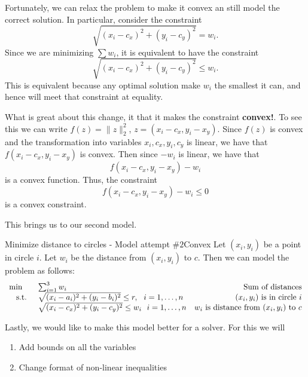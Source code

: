 \documentclass[../open-optimization/open-optimization.tex]{subfiles}
\begin{document}
Fortunately, we can relax the problem to make it convex an still model the correct solution.  In particular, consider the constraint 
$$
 \sqrt{(x_i - c_x)^2 + (y_i - c_y)^2} = w_i .
$$
Since we are minimizing $\sum w_i$, it is equivalent to have the constraint
$$
 \sqrt{(x_i - c_x)^2 + (y_i - c_y)^2} \leq w_i.
$$
This is equivalent because any optimal solution make $w_i$ the smallest it can, and hence will meet that constraint at equality.  

What is great about this change, it that it makes the constraint \textbf{convex!}. To see this we can write $f(z) = \|z\|_2^2$, $z = (x_i - c_x, y_i - x_y)$.  Since $f(z)$ is convex and the transformation into variables $x_i, c_x, y_i, c_y$ is linear, we have that $f(x_i - c_x, y_i - x_y)$ is convex.   Then since $-w_i$ is linear, we have that
$$
f(x_i - c_x, y_i - x_y) - w_i
$$
is a convex function.  Thus, the constraint 
$$
f(x_i - c_x, y_i - x_y) - w_i \leq 0 
$$
is a convex constraint.


This brings us to our second model.


\begin{general}{Minimize distance to circles - Model attempt $\#2$}{Convex}
Let $(x_i,y_i)$ be a point in circle $i$.  Let $w_i$ be the distance from $(x_i, y_i)$ to $c$.  Then we can  model the problem as follows:
\begin{equation}
\begin{array}{rlr}
\min \quad & \sum_{i=1}^3 w_i \hfill & \text{ Sum of distances}\\
\text{ s.t. } &  \sqrt{(x_i - a_i)^2  + (y_i - b_i)^2}  \leq r , \ \ i=1,\dots, n& \text{ $(x_i, y_i)$ is in circle $i$}\\
& \sqrt{(x_i - c_x)^2 + (y_i - c_y)^2}\leq w_i \ \ i=1, \dots, n & \text{$w_i$ is distance from $(x_i, y_i)$ to $c$}\\
\end{array}
\end{equation}
\end{general}

Lastly, we would like to make this model better for a solver.  For this we will

\begin{enumerate}
\item Add bounds on all the variables
\item Change format of non-linear inequalities
\end{enumerate}
\end{document}
